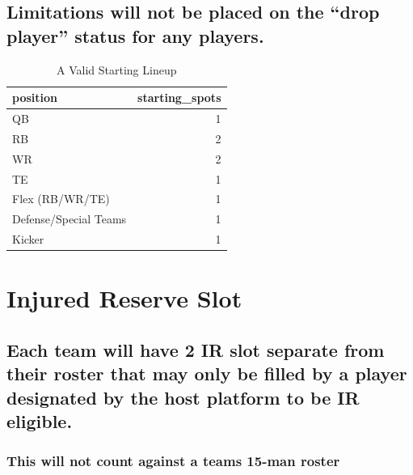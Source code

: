 \documentclass[
]{book}
\begin{document}
\hypertarget{limitations-will-not-be-placed-on-the-drop-player-status-for-any-players.}{%
\subsection{Limitations will not be placed on the ``drop player'' status for any players.}\label{limitations-will-not-be-placed-on-the-drop-player-status-for-any-players.}}

\begin{table}

\caption{\label{tab:unnamed-chunk-9}A Valid Starting Lineup}
\centering
\begin{tabular}[t]{lr}
\toprule
position & starting\_spots\\
\midrule
QB & 1\\
RB & 2\\
WR & 2\\
TE & 1\\
Flex (RB/WR/TE) & 1\\
\addlinespace
Defense/Special Teams & 1\\
Kicker & 1\\
\bottomrule
\end{tabular}
\end{table}

\hypertarget{injured-reserve-slot}{%
\section{Injured Reserve Slot}\label{injured-reserve-slot}}

\hypertarget{each-team-will-have-2-ir-slot-separate-from-their-roster-that-may-only-be-filled-by-a-player-designated-by-the-host-platform-to-be-ir-eligible.}{%
\subsection{Each team will have 2 IR slot separate from their roster that may only be filled by a player designated by the host platform to be IR eligible.}\label{each-team-will-have-2-ir-slot-separate-from-their-roster-that-may-only-be-filled-by-a-player-designated-by-the-host-platform-to-be-ir-eligible.}}

\hypertarget{this-will-not-count-against-a-teams-15-man-roster}{%
\subsubsection{This will not count against a teams 15-man roster}\label{this-will-not-count-against-a-teams-15-man-roster}}
\end{document}
